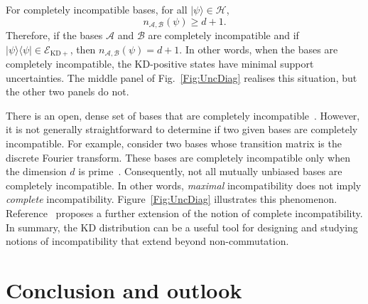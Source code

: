 \documentclass[%
 reprint,
superscriptaddress,
nofootinbib,
bibnotes,
 amsmath,amssymb,
 aps,
]{revtex4-1}
\theoremstyle{plain}
\newcommand*{\ketbra}[2]{\lvert #1 \rangle\!\langle #2 \rvert}
\newcommand{\cket}[1]{|#1\rangle}
\newcommand{\Acal}{{\mathcal A}}
\newcommand{\Bcal}{{\mathcal B}}
\newcommand{\EcalKDC}{{\mathcal E}_{\mathrm{KD+}}}
\newcommand{\Hcal}{{\mathcal H}}
\newcommand{\nab}{n_{\Acal,\Bcal}}
\begin{document}
For completely incompatible bases, for all $\cket{\psi}\in\Hcal$,
\begin{equation}
\nab(\psi)\geq d+1.
\end{equation}
Therefore, if the bases $\Acal$ and $\Bcal$ are completely incompatible and if $\ketbra{\psi}{\psi} \in\EcalKDC$, then $\nab(\psi)=d+1$. In other words, when the bases are completely incompatible, the KD-positive states have minimal support uncertainties. 
The middle panel of Fig.~\ref{Fig:UncDiag} realises this situation, but the other two panels do not.


There is an open, dense set of bases that are completely incompatible~\cite{debievre2023}. However, it is not  generally straightforward to determine if two given bases are  completely incompatible. For example, consider two bases whose transition matrix is the discrete Fourier transform. These bases 
are completely incompatible only when the dimension $d$ is prime~\cite{langrenez2023characterizing}. Consequently, not all mutually unbiased bases are completely incompatible. In other words, \textit{maximal} incompatibility does not imply \textit{complete} incompatibility.  
Figure~\ref{Fig:UncDiag} illustrates this phenomenon. Reference~\cite{xu2022a} proposes a further extension of the notion of complete incompatibility. In summary,  the KD distribution can be a useful tool for designing and studying notions of  incompatibility that extend beyond  non-commutation. 











\section{Conclusion and outlook}
\end{document}
